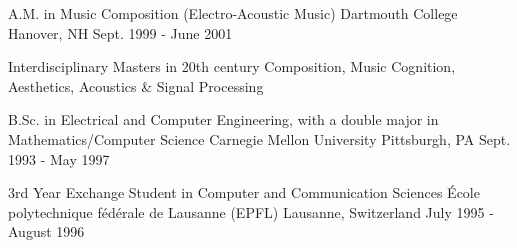 

\begin{cventries}

  \cventry
    {A.M. in Music Composition (Electro-Acoustic Music)} %
    {Dartmouth College} %
    {Hanover, NH} %
    {Sept. 1999 - June 2001} %
    {
      \begin{cvitems} %
        \item {Interdisciplinary Masters in 20th century Composition, Music Cognition, Aesthetics, Acoustics \& Signal Processing}
      \end{cvitems}
    }

  \cventry
    {B.Sc. in Electrical and Computer Engineering, with a double major in Mathematics/Computer Science} %
    {Carnegie Mellon University} %
    {Pittsburgh, PA} %
    {Sept. 1993 - May 1997} %
    {
      \begin{cvitems} %
      \end{cvitems}
    }
    
  \cventry
    {3rd Year Exchange Student in Computer and Communication Sciences} %
    {{\'E}cole polytechnique f{\'e}d{\'e}rale de Lausanne (EPFL)} %
    {Lausanne, Switzerland} %
    {July 1995 - August 1996} %
    {
      \begin{cvitems} %
      \end{cvitems}
    }
    
\end{cventries}
